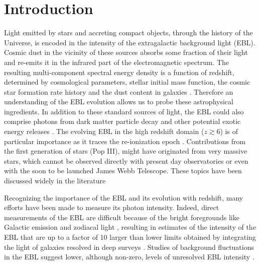 \documentclass[12pt,preprint]{aastex}
\begin{document}


\section{Introduction}

Light emitted by stars and accreting compact objects,
through the history of the Universe,
is encoded in the intensity of the extragalactic background light (EBL). 
Cosmic dust in the vicinity of these sources absorbs some fraction of their light and re-emits it 
in the infrared part of the electromagnetic spectrum.
The resulting multi-component spectral energy density is a function of redshift, determined by
cosmological parameters, {stellar initial mass function}, the cosmic star formation rate
history and {the dust content in galaxies} {\citep{2001ARA&A..39..249H,2005PhR...409..361K}}.
Therefore an understanding of the EBL evolution allows us to probe these astrophysical ingredients.
In addition to these standard sources of light, the EBL could also comprise
photons from dark matter particle decay and other potential exotic energy
releases \citep{2012ApJ...745..166M,dom13}.
The evolving EBL in the high redshift domain ($z\gtrsim$6) is of
particular importance as it traces the re-ionization epoch \citep{inoue14}.
Contributions from the first generation of stars (Pop III), might have
originated from very massive stars, which cannot be observed directly
with present day observatories or even with the soon to be launched James Webb Telescope.
These topics have been discussed widely in the literature { \citep{ carr86,dwek05b,raue09,gilmore2012,kashlinsky05,kashlinsky12,inoue13,dwek14}}



Recognizing the importance of {the} EBL and its evolution with redshift, many efforts have been made to 
 {measure its photon intensity}.
Indeed, direct measurements of the EBL are difficult because of the
bright foregrounds like Galactic emission and zodiacal light {\citep{hauser98,matsumoto05,matsuoka11,mattila17}},
 {resulting in estimates of the intensity of the EBL} that are up to a factor of 10 larger than lower limits obtained by integrating the light of
 galaxies resolved in deep surveys \citep{madau00,keenan10,driver16}. 
 {Studies of background fluctuations in the EBL suggest lower, although non-zero, levels
 of unresolved EBL intensity \citep{kashlinsky12,zemcov2014}.}
 
\end{document}
